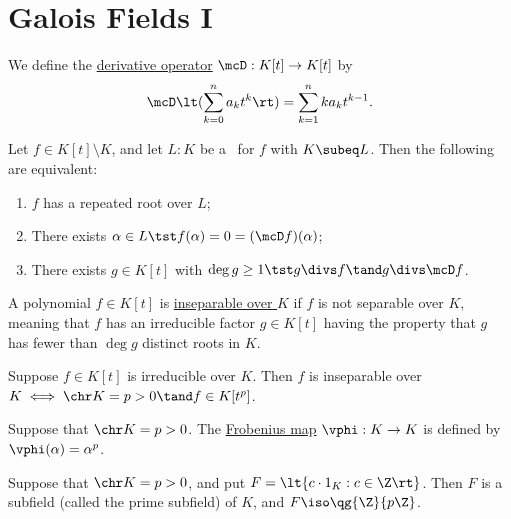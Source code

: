 \documentclass[a4paper]{article}
\begin{document}
\section{Galois Fields I}
\begin{tdefinition}
  We define the \ul{derivative operator} \( \mcD:K[t]\to K[t] \) by \begin{align*}
    \mcD\lt(\sum_{k=0}^{n}a_kt^k\rt) = \sum_{k=1}^{n}ka_kt^{k-1}.
  \end{align*}
\end{tdefinition}

\begin{ttheorem}
  Let \( f\in K[t]\setminus K \), and let \( L:K \) be a \sfe~for \( f \) with \( K\subeq L \).
  Then the following are equivalent: \begin{enumerate}[label=(\roman*)]
    \item \( f \) has a repeated root over \( L \);
    \item There exists \( \alpha\in L \tst f(\alpha)=0=(\mcD f)(\alpha) \);
    \item There exists \( g\in K[t] \) with \( \deg g \geq 1 \tst g \divs f \tand g\divs\mcD f \).
  \end{enumerate}
\end{ttheorem}

\begin{tdefinition}[Inseparable]
  A polynomial \( f \in K[t] \) is \ul{inseparable over \( K \)} if \( f \) is not separable over \( K \), meaning that \( f \) has an irreducible factor \( g \in K[t] \) having the property that \( g \) has fewer than \( \deg g \) distinct roots in \( K \).
\end{tdefinition}

\begin{ttheorem}
  Suppose \( f\in K[t] \) is irreducible over \( K \).
  Then \( f \) is inseparable over \( K \iff \chr K=p>0 \tand f \in K[t^p]\).
\end{ttheorem}

\begin{tdefinition}
  Suppose that \( \chr K = p > 0 \).
  The \ul{Frobenius map} \( \vphi:K\to K \) is defined by \( \vphi(\alpha)=\alpha^p \).
\end{tdefinition}

\begin{ttheorem}
  Suppose that \( \chr K = p > 0 \), and put \( F=\lt\{ c\cdot 1_K : c\in \Z \rt\} \).
  Then \( F \) is a subfield (called the prime subfield) of \( K \), and \( F\iso \qg{\Z}{p\Z} \).
\end{ttheorem}
\end{document}

